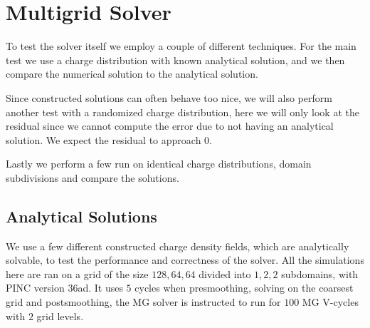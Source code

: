 \section{Multigrid Solver}
	To test the solver itself we employ a couple of different techniques.
	For the main test we use a charge distribution with known analytical solution,
	and we then compare the numerical solution to the analytical solution.

	Since constructed solutions can often behave too nice, we will also perform
	another test with a randomized charge distribution, here we will only look at the
	residual since we cannot compute the error due to not having an analytical solution.
	We expect the residual to approach \(0\).

	Lastly we perform a few run on identical charge distributions, domain subdivisions
	and compare the solutions.

%




\subsection{Analytical Solutions}
	We use a few different constructed charge density fields, which are analytically solvable,
	to test the performance and correctness of the solver. All the simulations here are ran on
	a grid of the size \( 128, 64, 64 \) divided into \(1,2,2\) subdomains, with PINC
	version 36ad.
		It uses \(5\) cycles when presmoothing, solving on the coarsest grid and postsmoothing, the
	MG solver is instructed to run for \(100\) MG V-cycles with \(2\) grid levels.


